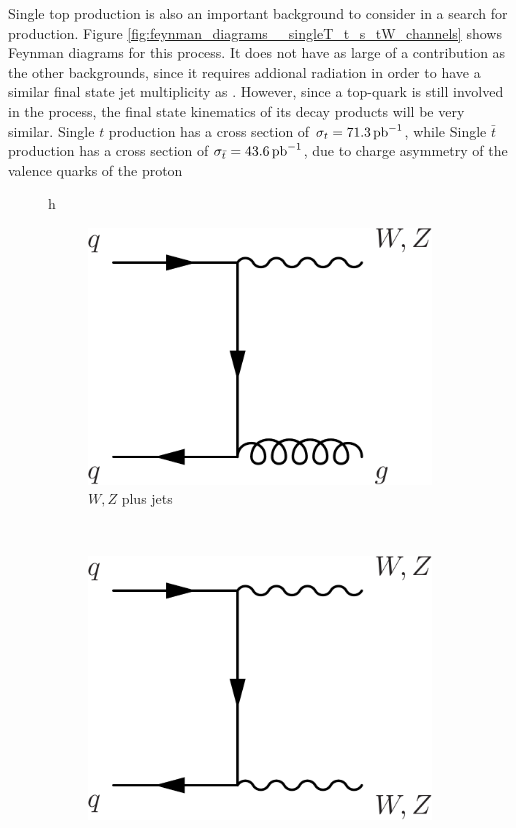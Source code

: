 \par Single top production is also an important background to consider
in a search for \ttH production.  Figure
\ref{fig:feynman_diagrams__singleT_t_s_tW_channels} shows Feynman
diagrams for this process.  It does not have as large of a
contribution as the other backgrounds, since it requires addional
radiation in order to have a similar final state jet multiplicity as
\ttH.  However, since a top-quark is still involved in the process,
the final state kinematics of its decay products will be very similar.
 Single $t$ production has a cross section of $\sigma_{t}=71.3\mbox{\ensuremath{\,\text{pb}^\text{$-$1}}}$,
 while Single $\bar{t}$ production has a cross section of
 $\sigma_{\bar{t}}=43.6\mbox{\ensuremath{\,\text{pb}^\text{$-$1}}}$, due to charge asymmetry of the valence
 quarks of the proton

\begin{figure}{h}
    \centering
    \begin{subfigure}[h]{0.3\textwidth}
        \includegraphics[width=\textwidth]{Figures/Feynman_Diagrams/backgrounds__VplusJets.pdf}
        \caption{$W,Z$ plus jets}\label{fd:t_tChan}
      \end{subfigure}
      ~ %
      \begin{subfigure}[h]{0.3\textwidth}
        \includegraphics[width=\textwidth]{Figures/Feynman_Diagrams/backgrounds__VV.pdf}

\end{subfigure}
\end{figure}
